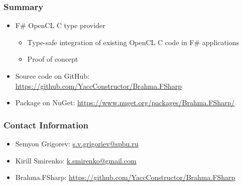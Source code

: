 \documentclass[xcolor=table]{beamer}
\begin{document}
            
\begin{frame}
  \transwipe[direction=90]
  \frametitle{Summary}         
\begin{itemize}
\item F\# OpenCL C type provider
\begin {itemize}
\item Type-safe integration of existing OpenCL C code in F\# applications
\item Proof of concept
\end{itemize}
\vspace{1cm}
\item Source code on GitHub: \url{https://github.com/YaccConstructor/Brahma.FSharp}
\item Package on NuGet: \url{https://www.nuget.org/packages/Brahma.FSharp/}
\end{itemize}
\end{frame}           
            
\begin{frame}
\transwipe[direction=90]
\frametitle{Contact Information}
\begin{itemize}
  \item Semyon Grigorev: \href{mailto:s.v.grigoriev@spbu.ru}{s.v.grigoriev@spbu.ru}
  \item Kirill Smirenko: \href{mailto:k.smirenko@gmail.com}{k.smirenko@gmail.com}
\end{itemize}
\begin{itemize}
  \item Brahma.FSharp: \href{https://github.com/YaccConstructor/Brahma.FSharp}{https://github.com/YaccConstructor/Brahma.FSharp}
\end{itemize}
\hspace{2cm}
\end{frame}
\end{document}
